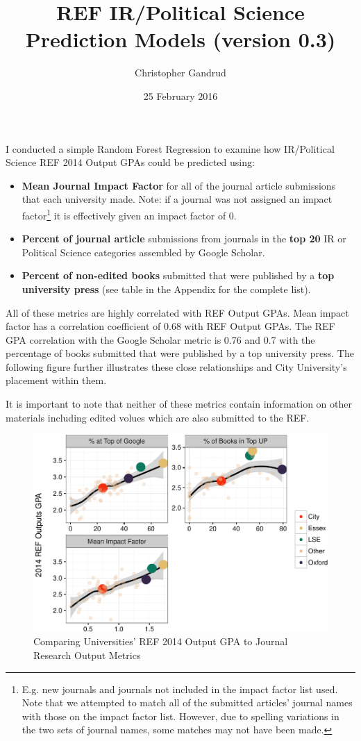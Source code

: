 \documentclass[]{article}
\title{REF IR/Political Science Prediction Models (version 0.3)}
\author{Christopher Gandrud}
\date{25 February 2016}
\let\rmarkdownfootnote\footnote%
\def\footnote{\protect\rmarkdownfootnote}
\begin{document}
\maketitle

I conducted a simple Random Forest Regression to examine how
IR/Political Science REF 2014 Output GPAs could be predicted using:

\begin{itemize}
\item
  \textbf{Mean Journal Impact Factor} for all of the journal article
  submissions that each university made. Note: if a journal was not
  assigned an impact factor\footnote{E.g. new journals and journals not
    included in the impact factor list used. Note that we attempted to
    match all of the submitted articles' journal names with those on the
    impact factor list. However, due to spelling variations in the two
    sets of journal names, some matches may not have been made.} it is
  effectively given an impact factor of 0.
\item
  \textbf{Percent of journal article} submissions from journals in the
  \textbf{top 20} IR or Political Science categories assembled by Google
  Scholar.
\item
  \textbf{Percent of non-edited books} submitted that were published by
  a \textbf{top university press} (see table in the Appendix for the
  complete list).
\end{itemize}

All of these metrics are highly correlated with REF Output GPAs. Mean
impact factor has a correlation coefficient of 0.68 with REF Output
GPAs. The REF GPA correlation with the Google Scholar metric is 0.76 and
0.7 with the percentage of books submitted that were published by a top
university press. The following figure further illustrates these close
relationships and City University's placement within them.

It is important to note that neither of these metrics contain
information on other materials including edited volues which are also
submitted to the REF.

\begin{figure}[htbp]
\centering
\includegraphics{README_files/figure-latex/descript-1.pdf}
\caption{Comparing Universities' REF 2014 Output GPA to Journal Research
Output Metrics}
\end{figure}
\end{document}
